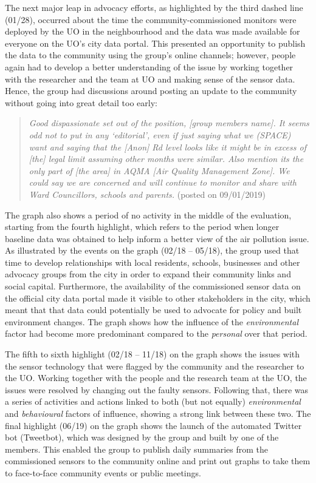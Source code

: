 The next major leap in advocacy efforts, as highlighted by the third dashed line (01/28), occurred about the time the community-commissioned monitors were deployed by the UO in the neighbourhood and the data was made available for everyone on the UO's city data portal. This presented an opportunity to publish the data to the community using the group's online channels; however, people again had to develop a better understanding of the issue by working together with the researcher and the team at UO and making sense of the sensor data. Hence, the group had discussions around posting an update to the community without going into great detail too early:
\begin{quote}
    \textit{Good dispassionate set out of the position, [group members name]. It seems odd not to put in any `editorial', even if just saying what we (SPACE) want and saying that the [Anon] Rd level looks like it might be in excess of [the] legal limit assuming other months were similar. Also mention its the only part of [the area] in AQMA [Air Quality Management Zone]. We could say we are concerned and will continue to monitor and share with Ward Councillors, schools and parents.} (posted on 09/01/2019)
\end{quote}
The graph also shows a period of no activity in the middle of the evaluation, starting from the fourth highlight, which refers to the period when longer baseline data was obtained to help inform a better view of the air pollution issue. As illustrated by the events on the graph (02/18 -- 05/18), the group used that time to develop relationships with local residents, schools, businesses and other advocacy groups from the city in order to expand their community links and social capital. Furthermore, the availability of the commissioned sensor data on the official city data portal made it visible to other stakeholders in the city, which meant that that data could potentially be used to advocate for policy and built environment changes. The graph shows how the influence of the \textit{environmental} factor had become more predominant compared to the \textit{personal} over that period.

The fifth to sixth highlight (02/18 -- 11/18) on the graph shows the issues with the sensor technology that were flagged by the community and the researcher to the UO. Working together with the people and the research team at the UO, the issues were resolved by changing out the faulty sensors. Following that, there was a series of activities and actions linked to both (but not equally) \textit{environmental} and \textit{behavioural} factors of influence, showing a strong link between these two. The final highlight (06/19) on the graph shows the launch of the automated Twitter bot (Tweetbot), which was designed by the group and built by one of the members. This enabled the group to publish daily summaries from the commissioned sensors to the community online and print out graphs to take them to face-to-face community events or public meetings.

